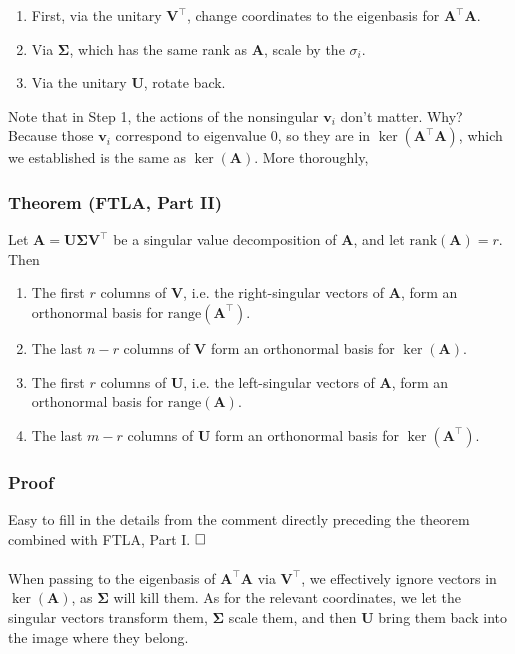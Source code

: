 \documentclass{article}
\begin{document}
\begin{enumerate}
    \item First, via the unitary $\textbf{V}^\top$, change coordinates to the eigenbasis for $\textbf{A}^\top\textbf{A}$.
    \item Via $\mathbf{\Sigma}$, which has the same rank as $\textbf{A}$, scale by the $\sigma_i$.
    \item Via the unitary $\textbf{U}$, rotate back.
\end{enumerate}
Note that in Step 1, the actions of the nonsingular $\textbf{v}_i$ don't matter. Why? Because those $\textbf{v}_i$ correspond to eigenvalue 0, so they are in $\ker (\textbf{A}^\top\textbf{A})$, which we established is the same as $\ker(\textbf{A})$. More thoroughly,
\subsubsection*{Theorem (FTLA, Part II)}
Let $\textbf{A} = \mathbf{U\Sigma V}^\top$ be a singular value decomposition of $\textbf{A}$, and let $\text{rank}(\textbf{A}) = r$. Then
\begin{enumerate}[label=(\roman*)]
    \item The first $r$ columns of $\textbf{V}$, i.e. the right-singular vectors of $\textbf{A}$, form an orthonormal basis for $\text{range}(\textbf{A}^\top)$.
    \item The last $n-r$ columns of $\textbf{V}$ form an orthonormal basis for $\ker(\textbf{A})$.
    \item The first $r$ columns of $\textbf{U}$, i.e. the left-singular vectors of $\textbf{A}$, form an orthonormal basis for $\text{range}(\textbf{A})$.
    \item The last $m-r$ columns of $\textbf{U}$ form an orthonormal basis for $\ker(\textbf{A}^\top)$.
\end{enumerate}
\subsubsection*{Proof}
Easy to fill in the details from the comment directly preceding the theorem combined with FTLA, Part I. $\hfill\square$ 
\\ \\
When passing to the eigenbasis of $\textbf{A}^\top\textbf{A}$ via $\textbf{V}^\top$, we effectively ignore vectors in $\ker(\textbf{A})$, as $\mathbf{\Sigma}$ will kill them. As for the relevant coordinates, we let the singular vectors transform them, $\mathbf{\Sigma}$ scale them, and then $\textbf{U}$ bring them back into the image where they belong. 
\end{document}

